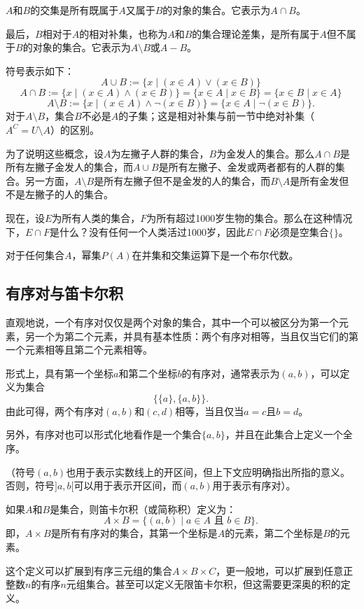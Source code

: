 $A$和$B$的交集是所有既属于$A$又属于$B$的对象的集合。它表示为$A \cap B$。

最后，$B$相对于$A$的相对补集，也称为$A$和$B$的集合理论差集，是所有属于$A$但不属于$B$的对象的集合。它表示为$A \setminus B$或$A - B$。

符号表示如下：
$$A \cup B := \{x \mid (x \in A) \vee (x \in B)\}~$$  
$$A \cap B := \{x \mid (x \in A) \wedge (x \in B)\} = \{x \in A \mid x \in B\} = \{x \in B \mid x \in A\}~$$ 
$$A \setminus B := \{x \mid (x \in A) \wedge \neg (x \in B)\} = \{x \in A \mid \neg (x \in B)\}.~$$
对于$A \setminus B$，集合$B$不必是$A$的子集；这是相对补集与前一节中绝对补集（$A^C = U \setminus A$）的区别。

为了说明这些概念，设$A$为左撇子人群的集合，$B$为金发人的集合。那么$A \cap B$是所有左撇子金发人的集合，而$A \cup B$是所有左撇子、金发或两者都有的人群的集合。另一方面，$A \setminus B$是所有左撇子但不是金发的人的集合，而$B \setminus A$是所有金发但不是左撇子的人的集合。

现在，设$E$为所有人类的集合，$F$为所有超过1000岁生物的集合。那么在这种情况下，$E \cap F$是什么？没有任何一个人类活过1000岁，因此$E \cap F$必须是空集合$\{\}$。

对于任何集合$A$，幂集$P(A)$在并集和交集运算下是一个布尔代数。

\subsection{有序对与笛卡尔积 } 
直观地说，一个有序对仅仅是两个对象的集合，其中一个可以被区分为第一个元素，另一个为第二个元素，并具有基本性质：两个有序对相等，当且仅当它们的第一个元素相等且第二个元素相等。

形式上，具有第一个坐标$a$和第二个坐标$b$的有序对，通常表示为$(a, b)$，可以定义为集合
$$\{\{a\}, \{a, b\}\}.~$$
由此可得，两个有序对$(a, b)$和$(c, d)$相等，当且仅当$a = c$且$b = d$。

另外，有序对也可以形式化地看作是一个集合$\{a, b\}$，并且在此集合上定义一个全序。

（符号$(a, b)$也用于表示实数线上的开区间，但上下文应明确指出所指的意义。否则，符号$]a, b[$可以用于表示开区间，而$(a, b)$用于表示有序对）。

如果$A$和$B$是集合，则笛卡尔积（或简称积）定义为：
$$A \times B = \{(a, b) \mid a \in A \text{ 且 } b \in B\}.~$$
即，$A \times B$是所有有序对的集合，其第一个坐标是$A$的元素，第二个坐标是$B$的元素。

这个定义可以扩展到有序三元组的集合$A \times B \times C$，更一般地，可以扩展到任意正整数$n$的有序$n$元组集合。甚至可以定义无限笛卡尔积，但这需要更深奥的积的定义。

